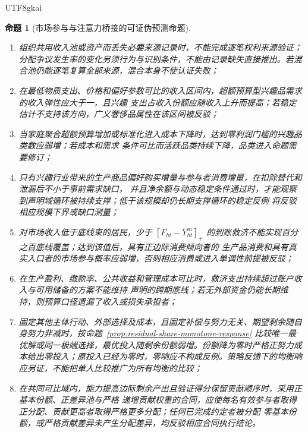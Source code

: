 \documentclass[12pt,a4paper,openany]{report}
\newtheorem{proposition}{命题}[chapter]
\begin{document}
\begin{CJK*}{UTF8}{gkai}
\begin{proposition}[市场参与与注意力桥接的可证伪预测命题]
\begin{enumerate}[label=\textnormal{P\arabic*:},leftmargin=3.5em]
  \item 组织共用收入池或资产而丢失必要来源记录时，不能完成逐笔权利来源验证；分配争议发生率的变化另须行为与识别条件，不能由记录缺失直接推出。若混合池仍能逐笔复算全部来源，混合本身不使认证失败；
  \item 在最低物质支出、价格和偏好参数可比的收入区间内，超额预算型兴趣品需求的收入弹性应大于一，且兴趣
  支出占收入份额应随收入上升而提高；若稳定估计不支持该方向，广义奢侈品属性在该区间被反驳；
  \item 当家庭聚合超额预算增加或标准化进入成本下降时，达到零利润门槛的兴趣品类数应弱增；若成本和需求
  条件可比而活跃品类持续下降，品类进入命题需要修订；
  \item 只有兴趣行业带来的生产商品偏好购买增量与参与者消费增量，在扣除替代和泄漏后不小于事前需求缺口，
  并且净余额与动态稳定条件通过时，才能观察到声明域循环被持续支撑；低于该规模却仍长期支撑循环的稳定反例
  将反驳相应规模下界或缺口测量；
  \item 对市场收入低于底线束的居民，少于
  \([F_{ht}-Y_{ht}^{m}]_+\) 的到账救济不能实现百分之百底线覆盖；达到该值后，具有正边际消费倾向者的
  生产品消费和具有真实入口者的市场参与概率应弱增，否则相应消费或进入单调性前提被反驳；
  \item 在生产盈利、缴款率、公共收益和管理成本可比时，救济支出持续超过账户收入与可用储备的方案不能维持
  声明的跨期底线；若无外部资金仍能长期维持，则预算口径遗漏了收入或损失承担者；
  \item 固定其他主体行动、外部选择及成本，且固定补偿与努力无关、期望剩余随自身努力非减时，按命题~\ref{prop:residual-share-monotone-response} 比较唯一最优解或同一极端选择，最优投入随剩余份额弱增。份额降为零时严格正努力成本给出零投入；原投入已经为零时，零响应不构成反例。策略反馈下的均衡响应另证，不能把单人比较推广为所有均衡的比较；
  \item 在共同可比域内，能力提高边际剩余产出且验证得分保留贡献顺序时，采用正基本份额、正差异池与严格
  递增贡献权重的合同，应使每名有效参与者取得正分配、贡献更高者取得严格更多分配；任何已完成约定者被分配
  零基本份额，或严格贡献差异未产生分配差异，均反驳相应合同执行结论。
\end{enumerate}
\end{proposition}


\end{CJK*}
\end{document}
